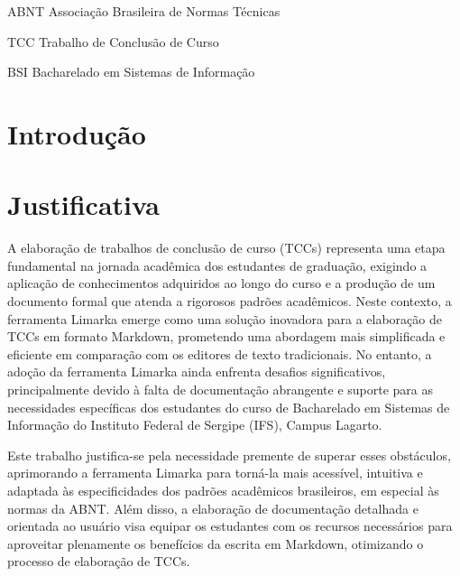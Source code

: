 \documentclass[
	12pt,				%
	oneside,			%
	a4paper,			%
	english,			%
	french,				%
	spanish,			%
	brazil				%
	]{abntex2}
\newcommand{\listasdousuario}{}
\begin{document}
\listasdousuario

\begin{siglas}
  \item[ABNT] Associação Brasileira de Normas Técnicas
  \item[TCC] Trabalho de Conclusão de Curso
  \item[BSI] Bacharelado em Sistemas de Informação
\end{siglas}

\tableofcontents*
\cleardoublepage


\textual
\pagestyle{simple}                  %


\hypertarget{introduuxe7uxe3o}{%
\chapter{Introdução}\label{introduuxe7uxe3o}}

\hypertarget{justificativa}{%
\chapter{Justificativa}\label{justificativa}}

A elaboração de trabalhos de conclusão de curso (TCCs) representa uma
etapa fundamental na jornada acadêmica dos estudantes de graduação,
exigindo a aplicação de conhecimentos adquiridos ao longo do curso e a
produção de um documento formal que atenda a rigorosos padrões
acadêmicos. Neste contexto, a ferramenta Limarka emerge como uma solução
inovadora para a elaboração de TCCs em formato Markdown, prometendo uma
abordagem mais simplificada e eficiente em comparação com os editores de
texto tradicionais. No entanto, a adoção da ferramenta Limarka ainda
enfrenta desafios significativos, principalmente devido à falta de
documentação abrangente e suporte para as necessidades específicas dos
estudantes do curso de Bacharelado em Sistemas de Informação do
Instituto Federal de Sergipe (IFS), Campus Lagarto.

Este trabalho justifica-se pela necessidade premente de superar esses
obstáculos, aprimorando a ferramenta Limarka para torná-la mais
acessível, intuitiva e adaptada às especificidades dos padrões
acadêmicos brasileiros, em especial às normas da ABNT. Além disso, a
elaboração de documentação detalhada e orientada ao usuário visa equipar
os estudantes com os recursos necessários para aproveitar plenamente os
benefícios da escrita em Markdown, otimizando o processo de elaboração
de TCCs.
\end{document}
